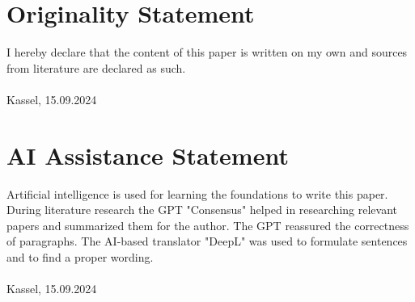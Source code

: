 \section{Originality Statement}
I hereby declare that the content of this paper is written on my own and sources from literature are declared as such.\vspace{2cm}\\
\underline{\hspace{10cm}}\\
\footnotesize Kassel, 15.09.2024 \normalsize
\section{AI Assistance Statement}
Artificial intelligence is used for learning the foundations to write this paper. During literature research the GPT "Consensus" helped in researching relevant papers and summarized them for the author. The GPT reassured the correctness of paragraphs. The AI-based translator "DeepL" was used to formulate sentences and to find a proper wording.\vspace{2cm}\\
\underline{\hspace{10cm}}\\
\footnotesize Kassel, 15.09.2024 \normalsize

